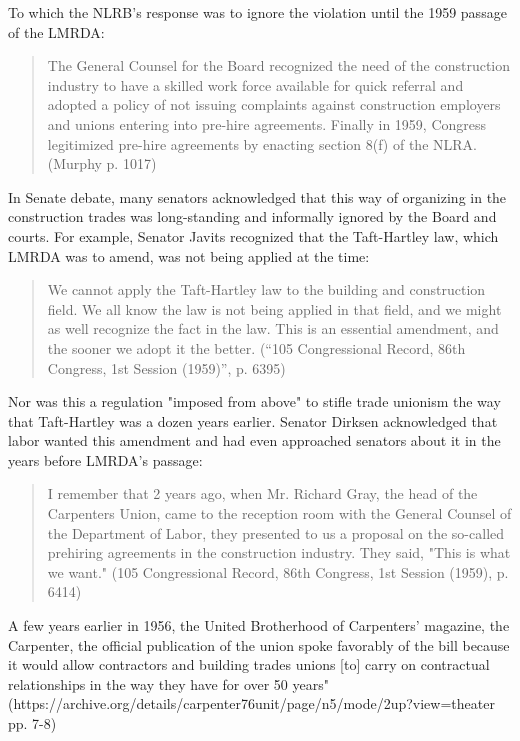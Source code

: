 To which the NLRB’s response was to ignore the violation until the 1959 passage of the LMRDA:

\begin{quote}
	The General Counsel for the Board recognized the need of the construction industry to have a skilled work force available for quick referral and adopted a policy of not issuing complaints against construction employers and unions entering into pre-hire agreements. Finally in 1959, Congress legitimized pre-hire agreements by enacting section 8(f) of the NLRA. (Murphy p. 1017)
\end{quote}

In Senate debate, many senators acknowledged that this way of organizing in the construction trades was long-standing and informally ignored by the Board and courts. For example, Senator Javits recognized that the Taft-Hartley law, which LMRDA was to amend, was not being applied at the time:

\begin{quote}
	We cannot apply the Taft-Hartley law to the building and construction field. We all know the law is not being applied in that field, and we might as well recognize the fact in the law. This is an essential amendment, and the sooner we adopt it the better. (“105 Congressional Record, 86th Congress, 1st Session (1959)”, p. 6395) 
\end{quote}

Nor was this a regulation "imposed from above" to stifle trade unionism the way that Taft-Hartley was a dozen years earlier. Senator Dirksen acknowledged that labor wanted this amendment and had even approached senators about it in the years before LMRDA’s passage:

\begin{quote}
	I remember that 2 years ago, when Mr. Richard Gray, the head of the Carpenters Union, came to the reception room with the General Counsel of the Department of Labor, they presented to us a proposal on the so-called prehiring agreements in the construction industry. They said, "This is what we want." (105 Congressional Record, 86th Congress, 1st Session (1959), p. 6414)
\end{quote}

A few years earlier in 1956, the United Brotherhood of Carpenters’ magazine, the Carpenter, the official publication of the union spoke favorably of the bill because it would allow contractors and building trades unions [to] carry on contractual relationships in the way they have for over 50 years" (https://archive.org/details/carpenter76unit/page/n5/mode/2up?view=theater pp. 7-8)

